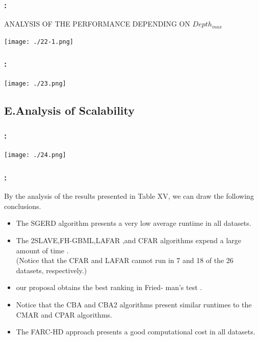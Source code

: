 \documentclass{beamer}
\begin{document}
\begin{CJK*}{UTF8}{bsmi}
\begin{frame}
	\frametitle{\insertsection : \insertsubsection}
	ANALYSIS OF THE PERFORMANCE DEPENDING ON $Depth_{max}$
	\begin{center}
		\texttt{[image: ./22-1.png]}
	\end{center}
\end{frame}


\begin{frame}
	\frametitle{\insertsection : \insertsubsection}
	\begin{center}
		\texttt{[image: ./23.png]}
	\end{center}
\end{frame}


\subsection{E.Analysis of Scalability}


\begin{frame}
	\frametitle{\insertsection : \insertsubsection}
	\begin{center}
		\texttt{[image: ./24.png]}
	\end{center}
\end{frame}


\begin{frame}
	\frametitle{\insertsection : \insertsubsection}

	\begin{block}{By the analysis of the results presented in Table XV, we can draw the following conclusions. }
		~\\
	\begin{itemize}
		\item The SGERD algorithm presents a very low average runtime in all datasets.
		\item The 2SLAVE,FH-GBML,LAFAR ,and CFAR algorithms expend a large amount of time .\\ (Notice that the CFAR and LAFAR cannot run in 7 and 18 of the 26 datasets, respectively.)
		\item our proposal obtains the best ranking in Fried- man’s test .
		\item Notice that the CBA and CBA2 algorithms present similar runtimes to the CMAR and CPAR algorithms.
		\item The FARC-HD approach presents a good computational cost in all datasets.
	\end{itemize}
		~\\
	\end{block}
	

\end{frame}
\end{CJK*}
\end{document}
